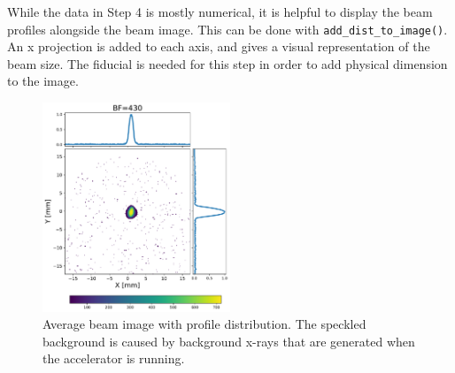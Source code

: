 While the data in Step 4 is mostly numerical, it is helpful to 
display the beam profiles alongside the beam image. 
This can be done with \verb|add_dist_to_image()|. 
An x projection is added to each axis, and gives a visual representation of the beam size. 
The fiducial is needed for this step in order to add physical dimension to the image.
\begin{figure}
	\centering
	\includegraphics[width=0.5\textwidth]{images/yag1_1nC_M260_BF430}
	\caption{Average beam image with profile distribution.
	The speckled background is caused by background x-rays that are 
	generated when the accelerator is running.}
\end{figure}


